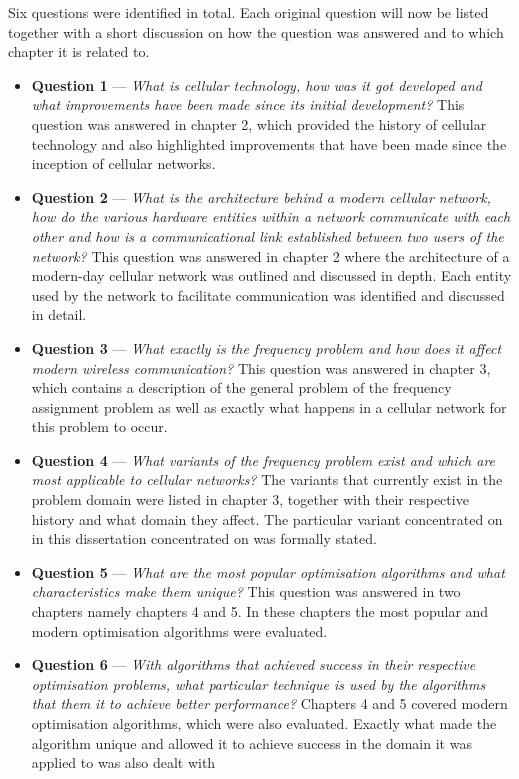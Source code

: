 Six questions were identified in total. Each original question will now be listed together with a short discussion on how the question was answered and to which chapter it is related to.
\begin{itemize}
\item \textbf{Question 1} --- \emph{What is cellular technology, how was it got developed and what improvements have been made since its initial development?} This question was answered in chapter 2, which provided the history of cellular technology and also highlighted improvements that have been made since the inception of cellular networks.
\item \textbf{Question 2} --- \emph{What is the architecture behind a modern cellular network, how do the various hardware entities within a network communicate with each other and how is a communicational link established between two users of the network?} This question was answered in chapter 2 where the architecture of a modern-day cellular network was outlined and discussed in depth. Each entity used by the network to facilitate communication was identified and discussed in detail.
\item \textbf{Question 3} --- \emph{What exactly is the frequency problem and how does it affect modern wireless communication? } This question was answered in chapter 3, which contains a description of the general problem of the frequency assignment problem as well as exactly what happens in a cellular network for this problem to occur.
\item \textbf{Question 4} --- \emph{What variants of the frequency problem exist and which are most applicable to cellular networks?} The variants that currently exist in the problem domain were listed in chapter 3, together with their respective history and what domain they affect. The particular variant concentrated on in this dissertation concentrated on was formally stated. 
\item \textbf{Question 5} --- \emph{What are the most popular optimisation algorithms and what characteristics make them unique?} This question was answered in two chapters namely chapters 4 and 5. In these chapters the most popular and modern optimisation algorithms were evaluated.
\item \textbf{Question 6} --- \emph{With algorithms that achieved success in their respective optimisation problems, what particular technique is used by the algorithms that them it to achieve better performance?} Chapters 4 and 5 covered modern optimisation algorithms, which were also evaluated. Exactly what made the algorithm unique and allowed it to achieve success in the domain it was applied to was also dealt with
\end{itemize}

